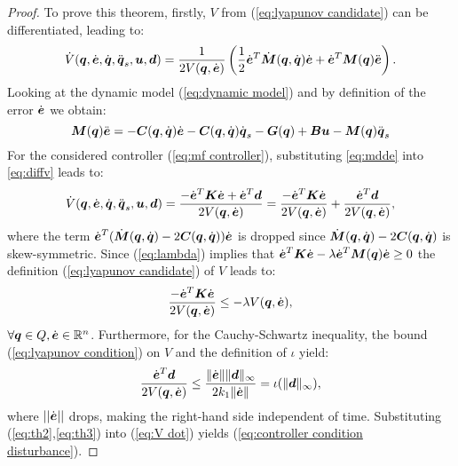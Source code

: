 \begin{proof}
    To prove this theorem, firstly,  $V$ from (\ref{eq:lyapunov candidate}) can be differentiated, leading to:
    \begin{equation}\label{eq:diffv}
        \dot{V}(\qv,\dot{\ev},\dot{\qv},\ddot{\qv}_s,\uv,\dv) = \frac{1}{2 V(\qv,\dot{\ev})} \left( \frac{1}{2}\dot{\ev}^T \dot{\Mm}(\qv, \dqv) \dot{\ev}+\dot{\ev}^T \Mm(\qv) \ddot{\ev} \right).
    \end{equation}
    Looking at the dynamic model (\ref{eq:dynamic model}) and by definition of the error $\dot{\ev}$ we obtain:
    \begin{equation}\label{eq:mdde}
     \Mm(\qv)\ddot{\ev}=-\Cm(\qv,\dot{\qv})\dot{\ev}-\Cm(\qv,\dot{\qv})\dot{\qv}_s-\Gm(\qv)+\Bm\uv-\Mm(\qv)\ddot{\qv}_s     
    \end{equation}
    For the considered controller (\ref{eq:mf controller}), substituting \eqref{eq:mdde} into \eqref{eq:diffv} leads to:
    \begin{equation} \label{eq:V dot}
        \dot{V}(\qv,\dot{\ev},\dot{\qv},\ddot{\qv}_s,\uv,\dv) = \frac{-\dot{\ev}^T \Km \dot{\ev} + \dot{\ev}^T \dv}{2 V(\qv,\dot{\ev})}=\frac{-\dot{\ev}^T \Km \dot{\ev}}{2 V(\qv,\dot{\ev})}+\frac{\dot{\ev}^T\dv}{2 V(\qv,\dot{\ev})},
    \end{equation}
    where the term $\dot{\ev}^T(\dot{\Mm}(\qv,\dot{\qv})-2\Cm(\qv,\dot{\qv}))\dot{\ev}$ is dropped since $\dot{\Mm}(\qv,\dot{\qv})-2\Cm(\qv,\dot{\qv})$ is skew-symmetric. 
    Since (\ref{eq:lambda}) implies that $\dot{\ev}^T \Km\dot{\ev}-\lambda \dot{\ev}^T \Mm(\qv) \dot{\ev} \geq 0$ the definition (\ref{eq:lyapunov candidate}) of $V$ leads to:
    \begin{equation} \label{eq:th2}
        \frac{-\dot{\ev}^T \Km\dot{\ev}}{2V(\qv,\dot{\ev})}\leq -\lambda V(\qv,\dot{\ev}),  
    \end{equation}
    $\forall \qv \in Q, \dot{\ev} \in \mathbb{R}^n$. Furthermore, for the Cauchy-Schwartz inequality, the bound (\ref{eq:lyapunov condition}) on $V$ and the definition of $\iota$ yield:
    \begin{equation} \label{eq:th3}
        \frac{\dot{\ev}^T\dv}{2V(\qv,\dot{\ev})}\leq \frac{\lVert \dot{\ev}\rVert \lVert \dv \rVert _\infty}{2k_1\lVert \dot{\ev} \rVert}=\iota(\lVert \dv \rVert _\infty),
    \end{equation}
    where $||\dot{\ev}||$ drops, making the right-hand side independent of time. Substituting (\ref{eq:th2},\ref{eq:th3}) into (\ref{eq:V dot}) yields (\ref{eq:controller condition disturbance}).
\end{proof}